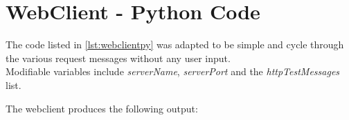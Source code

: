 \documentclass[11pt,a4paper]{report}
\begin{document}
    \section{WebClient - Python Code}
        \lstset{style=pythoncode}
        
        
        \begin{flushleft}
            The code listed in \ref{lst:webclientpy} was adapted to be simple and cycle through the various request messages without any user input. \\
            Modifiable variables include \textit{serverName}, \textit{serverPort} and the \textit{httpTestMessages} list. \\
        \end{flushleft}

        The webclient produces the following output:
        
\end{document}
